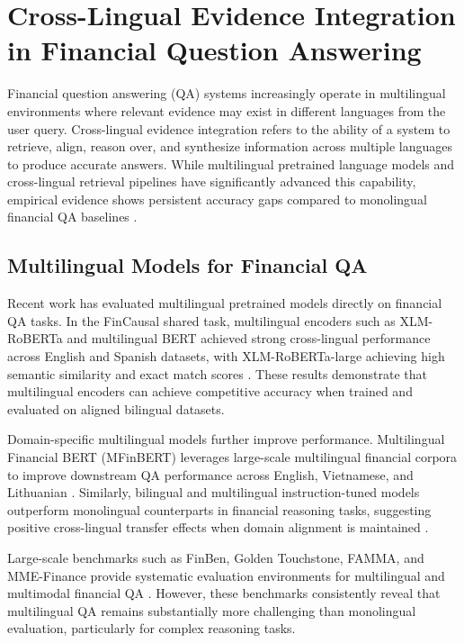 \section{Cross-Lingual Evidence Integration in Financial Question Answering}

Financial question answering (QA) systems increasingly operate in multilingual environments where relevant evidence may exist in different languages from the user query. Cross-lingual evidence integration refers to the ability of a system to retrieve, align, reason over, and synthesize information across multiple languages to produce accurate answers. While multilingual pretrained language models and cross-lingual retrieval pipelines have significantly advanced this capability, empirical evidence shows persistent accuracy gaps compared to monolingual financial QA baselines \citep{lewis2020mlqa, peng2025multifinben}.

\subsection{Multilingual Models for Financial QA}

Recent work has evaluated multilingual pretrained models directly on financial QA tasks. In the FinCausal shared task, multilingual encoders such as XLM-RoBERTa and multilingual BERT achieved strong cross-lingual performance across English and Spanish datasets, with XLM-RoBERTa-large achieving high semantic similarity and exact match scores \citep{allaith2025fincausal}. These results demonstrate that multilingual encoders can achieve competitive accuracy when trained and evaluated on aligned bilingual datasets.

Domain-specific multilingual models further improve performance. Multilingual Financial BERT (MFinBERT) leverages large-scale multilingual financial corpora to improve downstream QA performance across English, Vietnamese, and Lithuanian \citep{nguyen2022mfinbert}. Similarly, bilingual and multilingual instruction-tuned models outperform monolingual counterparts in financial reasoning tasks, suggesting positive cross-lingual transfer effects when domain alignment is maintained \citep{zhang2024dolares, hu2024nolanguage}.

Large-scale benchmarks such as FinBen, Golden Touchstone, FAMMA, and MME-Finance provide systematic evaluation environments for multilingual and multimodal financial QA \citep{xie2024finben, wu2024golden, xue2024famma, gan2025mme}. However, these benchmarks consistently reveal that multilingual QA remains substantially more challenging than monolingual evaluation, particularly for complex reasoning tasks.

